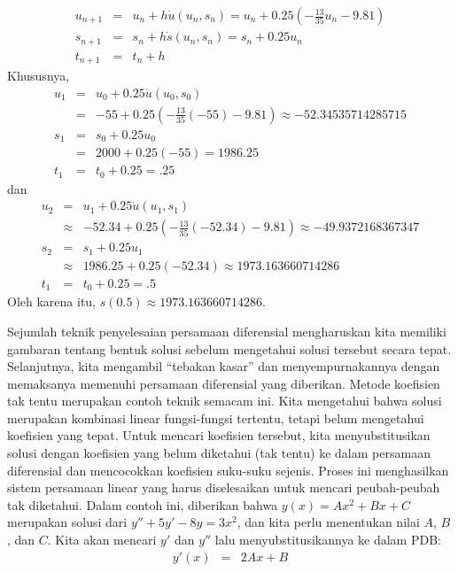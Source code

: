 \begin{description}
\begin{eqnarray*}
u_{n+1} & = & u_{n}+h\dot{u}(u_{n},s_{n})=u_{n}+0.25\left(-\frac{13}{35}u_{n}-9.81\right)\\
s_{n+1} & = & s_{n}+h\dot{s}(u_{n},s_{n})=s_{n}+0.25u_{n}\\
t_{n+1} & = & t_{n}+h
\end{eqnarray*}
Khususnya,
\begin{eqnarray*}
u_{1} & = & u_{0}+0.25\dot{u}(u_{0},s_{0})\\
 & = & -55+0.25\left(-\frac{13}{35}(-55)-9.81\right)\approx-52.34535714285715\\
s_{1} & = & s_{0}+0.25u_{0}\\
 & = & 2000+0.25(-55)=1986.25\\
t_{1} & = & t_{0}+0.25=.25
\end{eqnarray*}
dan
\begin{eqnarray*}
u_{2} & = & u_{1}+0.25\dot{u}(u_{1},s_{1})\\
 & \approx & -52.34+0.25\left(-\frac{13}{35}(-52.34)-9.81\right)\approx-49.9372168367347\\
s_{2} & = & s_{1}+0.25u_{1}\\
 & \approx & 1986.25+0.25(-52.34)\approx1973.163660714286\\
t_{1} & = & t_{0}+0.25=.5
\end{eqnarray*}
Oleh karena itu, $s(0.5)\approx1973.163660714286$.
\item [{\ref{exc:ode-taylor-14}:}] Sejumlah teknik penyelesaian persamaan
diferensial mengharuskan kita memiliki gambaran tentang bentuk solusi
sebelum mengetahui solusi tersebut secara tepat. Selanjutnya, kita
mengambil ``tebakan kasar'' dan menyempurnakannya dengan memaksanya
memenuhi persamaan diferensial yang diberikan. Metode koefisien tak
tentu merupakan contoh teknik semacam ini. Kita mengetahui bahwa solusi
merupakan kombinasi linear fungsi-fungsi tertentu, tetapi belum mengetahui
koefisien yang tepat. Untuk mencari koefisien tersebut, kita menyubstitusikan
solusi dengan koefisien yang belum diketahui (tak tentu) ke dalam
persamaan diferensial dan mencocokkan koefisien suku-suku sejenis.
Proses ini menghasilkan sistem persamaan linear yang harus diselesaikan
untuk mencari peubah-peubah tak diketahui. Dalam contoh ini, diberikan
bahwa $y(x)=Ax^{2}+Bx+C$ merupakan solusi dari $y''+5y'-8y=3x^{2}$,
dan kita perlu menentukan nilai $A$, $B$, dan $C$. Kita akan mencari
$y'$ dan $y''$ lalu menyubstitusikannya ke dalam PDB:
\begin{eqnarray*}
y'(x) & = & 2Ax+B\\

\end{eqnarray*}
\end{description}
